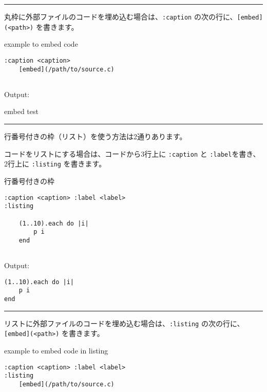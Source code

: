 \documentclass[a4j, titlepage]{jarticle}
\begin{document}
\begin{center}
\rule{3in}{0.4pt}
\end{center}

丸枠に外部ファイルのコードを埋め込む場合は、{\tt :caption} の次の行に、{\tt [embed](\textless{}path\textgreater{})} を書きます。

\begin{itembox}[c]{example to embed code}
\begin{verbatim}
:caption <caption>
    [embed](/path/to/source.c)
　
\end{verbatim}
\end{itembox}

Output:

\begin{itembox}[c]{embed test}
{\small

}
\end{itembox}

\begin{center}
\rule{3in}{0.4pt}
\end{center}

行番号付きの枠（リスト）を使う方法は2通りあります。

コードをリストにする場合は、コードから3行上に {\tt :caption} と {\tt :label}を書き、2行上に {\tt :listing} を書きます。

\begin{itembox}[c]{行番号付きの枠}
\begin{verbatim}
:caption <caption> :label <label>
:listing

    (1..10).each do |i|
        p i
    end
　
\end{verbatim}
\end{itembox}

Output:
　
\begin{lstlisting}[caption=iterate ,label=list:1]
(1..10).each do |i|
	p i
end
\end{lstlisting}

\begin{center}
\rule{3in}{0.4pt}
\end{center}

リストに外部ファイルのコードを埋め込む場合は、{\tt :listing} の次の行に、{\tt [embed](\textless{}path\textgreater{})} を書きます。

\begin{itembox}[c]{example to embed code in listing}
\begin{verbatim}
:caption <caption> :label <label>
:listing
    [embed](/path/to/source.c)
　
\end{verbatim}
\end{itembox}
\end{document}
